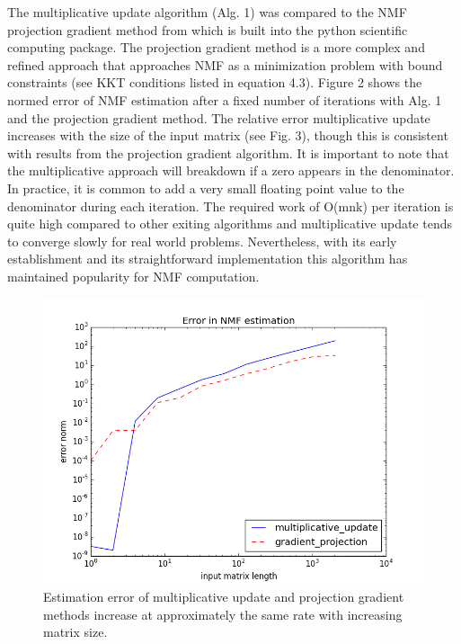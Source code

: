\documentclass[final,leqno,onefignum,onetabnum]{siamltex1213}
\begin{document}
The multiplicative update algorithm (Alg. 1) was compared to the NMF projection gradient method from \cite{Lin} which is built into the python scientific computing package. The projection gradient method is a more complex and refined approach that approaches NMF as a minimization problem with bound constraints (see KKT conditions listed in equation 4.3). Figure 2 shows the normed error of NMF estimation after a fixed number of iterations with Alg. 1 and the projection gradient method. The relative error multiplicative update increases with the size of the input matrix (see Fig. 3), though this is consistent with results from the projection gradient algorithm. It is important to note that the multiplicative approach will breakdown if a zero appears in the denominator. In practice, it is common to add a very small floating point value to the denominator during each iteration. The required work of O(mnk) per iteration is quite high compared to other exiting algorithms and multiplicative update tends to converge slowly for real world problems. Nevertheless, with its early establishment and its straightforward implementation this algorithm has maintained popularity for NMF computation. 

\begin{figure}[t!]
  \centering
    \includegraphics[width=.5\linewidth]{NMF_projection_gradient_vs_multiplicative_update_error}
  \caption{Estimation error of multiplicative update and projection gradient methods increase at approximately the same rate with increasing matrix size.}
\end{figure}
\end{document}
